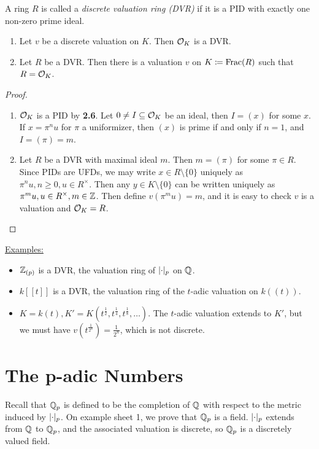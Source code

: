 \documentclass[10pt,a4paper]{article}
\begin{document}
\begin{definition}
  A ring $R$ is called a \emph{discrete valuation ring (DVR)} if it is a PID with exactly one non-zero prime ideal.
\end{definition}
\begin{lemma}\hspace*{0cm}
  \begin{enumerate}
    \item Let $v$ be a discrete valuation on $K$. Then $\mathcal{O}_K$ is a DVR.
    \item Let $R$ be a DVR. Then there is a valuation $v$ on $K \coloneqq \operatorname{Frac}(R)$ such that $R = \mathcal{O}_K$.
  \end{enumerate}
\end{lemma}
\begin{proof}\hspace*{0cm}
  \begin{enumerate}
    \item $\mathcal{O}_K$ is a PID by \textbf{2.6}. Let $0 \neq I \subseteq \mathcal{O}_K$ be an ideal, then $I = (x)$ for some $x$. If $x = \pi^nu$ for $\pi$ a uniformizer, then $(x)$ is prime if and only if $n = 1$, and $I = (\pi) = m$.

    \item Let $R$ be a DVR with maximal ideal $m$. Then $m = (\pi)$ for some $\pi \in R$. Since PIDs are UFDs, we may write $x \in R\setminus\{0\}$ uniquely as $\pi^n u, n\geq0, u \in R^\times$. Then any $y \in K\setminus\{0\}$ can be written uniquely as $\pi^m u, u \in R^\times, m \in \mathbb{Z}$. Then define $v(\pi^m u) = m$, and it is easy to check $v$ is a valuation and $\mathcal{O}_K = R$.
  \end{enumerate}
\end{proof}

\underline{Examples:}
\begin{itemize}
  \item $\mathbb{Z}_{(p)}$ is a DVR, the valuation ring of $\lvert\cdot\rvert_p$ on $\mathbb{Q}$.
  \item $k[[t]]$ is a DVR, the valuation ring of the $t$-adic valuation on $k((t))$.
  \item $K = k(t), K' = K\left(t^{\frac12}, t^{\frac14}, t^{\frac18}, \ldots\right)$. The $t$-adic valuation extends to $K'$, but we must have $v(t^{\frac{1}{2^n}}) = \frac{1}{2^n}$, which is not discrete.
\end{itemize}

\section{The p-adic Numbers}
Recall that $\mathbb{Q}_p$ is defined to be the completion of $\mathbb{Q}$ with respect to the metric induced by $\lvert\cdot\rvert_p$. On example sheet 1, we prove that $\mathbb{Q}_p$ is a field. $\lvert\cdot\rvert_p$ extends from $\mathbb{Q}$ to $\mathbb{Q}_p$, and the associated valuation is discrete, so $\mathbb{Q}_p$ is a discretely valued field.
\end{document}
